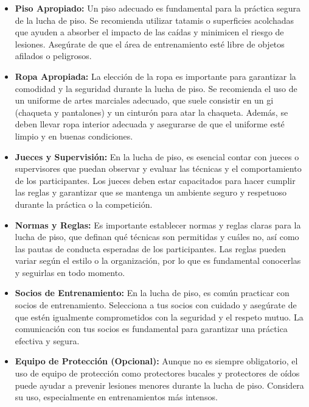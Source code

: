\begin{itemize}
	\item \textbf{Piso Apropiado:} Un piso adecuado es fundamental para la práctica segura de la lucha de piso. Se recomienda utilizar tatamis o superficies acolchadas que ayuden a absorber el impacto de las caídas y minimicen el riesgo de lesiones. Asegúrate de que el área de entrenamiento esté libre de objetos afilados o peligrosos.

	\item \textbf{Ropa Apropiada:} La elección de la ropa es importante para garantizar la comodidad y la seguridad durante la lucha de piso. Se recomienda el uso de un uniforme de artes marciales adecuado, que suele consistir en un gi (chaqueta y pantalones) y un cinturón para atar la chaqueta. Además, se deben llevar ropa interior adecuada y asegurarse de que el uniforme esté limpio y en buenas condiciones.

	\item \textbf{Jueces y Supervisión:} En la lucha de piso, es esencial contar con jueces o supervisores que puedan observar y evaluar las técnicas y el comportamiento de los participantes. Los jueces deben estar capacitados para hacer cumplir las reglas y garantizar que se mantenga un ambiente seguro y respetuoso durante la práctica o la competición.

	\item \textbf{Normas y Reglas:} Es importante establecer normas y reglas claras para la lucha de piso, que definan qué técnicas son permitidas y cuáles no, así como las pautas de conducta esperadas de los participantes. Las reglas pueden variar según el estilo o la organización, por lo que es fundamental conocerlas y seguirlas en todo momento.

	\item \textbf{Socios de Entrenamiento:} En la lucha de piso, es común practicar con socios de entrenamiento. Selecciona a tus socios con cuidado y asegúrate de que estén igualmente comprometidos con la seguridad y el respeto mutuo. La comunicación con tus socios es fundamental para garantizar una práctica efectiva y segura.

	\item \textbf{Equipo de Protección (Opcional):} Aunque no es siempre obligatorio, el uso de equipo de protección como protectores bucales y protectores de oídos puede ayudar a prevenir lesiones menores durante la lucha de piso. Considera su uso, especialmente en entrenamientos más intensos.
\end{itemize}

